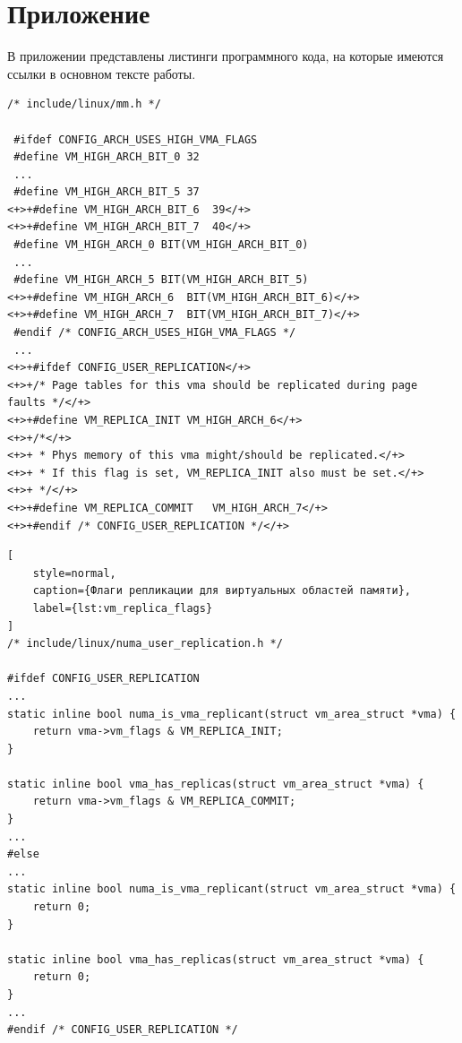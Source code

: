 \section*{Приложение}
\label{sec:Apendix} 
\hypertarget{sec:Appendix_hypertarget}{}


В приложении представлены листинги программного кода, на которые имеются ссылки в основном тексте работы.


\begin{lstlisting}[style=diff]
 /* include/linux/mm.h */

 #ifdef CONFIG_ARCH_USES_HIGH_VMA_FLAGS
 #define VM_HIGH_ARCH_BIT_0	32
 ...
 #define VM_HIGH_ARCH_BIT_5	37
<+>+#define VM_HIGH_ARCH_BIT_6	39</+>
<+>+#define VM_HIGH_ARCH_BIT_7	40</+>
 #define VM_HIGH_ARCH_0	BIT(VM_HIGH_ARCH_BIT_0)
 ...
 #define VM_HIGH_ARCH_5	BIT(VM_HIGH_ARCH_BIT_5)
<+>+#define VM_HIGH_ARCH_6	BIT(VM_HIGH_ARCH_BIT_6)</+>
<+>+#define VM_HIGH_ARCH_7	BIT(VM_HIGH_ARCH_BIT_7)</+>
 #endif /* CONFIG_ARCH_USES_HIGH_VMA_FLAGS */
 ...
<+>+#ifdef CONFIG_USER_REPLICATION</+>
<+>+/* Page tables for this vma should be replicated during page faults */</+>
<+>+#define VM_REPLICA_INIT	VM_HIGH_ARCH_6</+>
<+>+/*</+>
<+>+ * Phys memory of this vma might/should be replicated.</+>
<+>+ * If this flag is set, VM_REPLICA_INIT also must be set.</+>
<+>+ */</+>
<+>+#define VM_REPLICA_COMMIT	VM_HIGH_ARCH_7</+>
<+>+#endif /* CONFIG_USER_REPLICATION */</+>
\end{lstlisting}
\begin{lstlisting}[
    style=normal,
    caption={Флаги репликации для виртуальных областей памяти},
    label={lst:vm_replica_flags}
]
/* include/linux/numa_user_replication.h */

#ifdef CONFIG_USER_REPLICATION
...
static inline bool numa_is_vma_replicant(struct vm_area_struct *vma) {
	return vma->vm_flags & VM_REPLICA_INIT;
}

static inline bool vma_has_replicas(struct vm_area_struct *vma) {
	return vma->vm_flags & VM_REPLICA_COMMIT;
}
...
#else
...
static inline bool numa_is_vma_replicant(struct vm_area_struct *vma) {
	return 0;
}

static inline bool vma_has_replicas(struct vm_area_struct *vma) {
	return 0;
}
...
#endif /* CONFIG_USER_REPLICATION */
\end{lstlisting}
\vspace{0.5cm}

